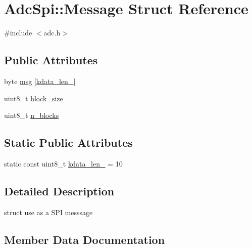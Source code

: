 \hypertarget{structAdcSpi_1_1Message}{}\section{Adc\+Spi\+:\+:Message Struct Reference}
\label{structAdcSpi_1_1Message}


{\ttfamily \#include $<$adc.\+h$>$}

\subsection*{Public Attributes}
\begin{DoxyCompactItemize}
\item 
byte \mbox{\hyperlink{structAdcSpi_1_1Message_a958a98a8a79743532b8bdf1cfe339eb2}{msg}} \mbox{[}\mbox{\hyperlink{structAdcSpi_1_1Message_adf1b26b00ddb16b65de390919c8d2270}{kdata\+\_\+len\+\_\+}}\mbox{]}
\item 
uint8\+\_\+t \mbox{\hyperlink{structAdcSpi_1_1Message_a48fe320baa3704229c910e9a67fe3ee1}{block\+\_\+size}}
\item 
uint8\+\_\+t \mbox{\hyperlink{structAdcSpi_1_1Message_a7f1b15e4a568314fee4210faaed79a62}{n\+\_\+blocks}}
\end{DoxyCompactItemize}
\subsection*{Static Public Attributes}
\begin{DoxyCompactItemize}
\item 
static const uint8\+\_\+t \mbox{\hyperlink{structAdcSpi_1_1Message_adf1b26b00ddb16b65de390919c8d2270}{kdata\+\_\+len\+\_\+}} = 10
\end{DoxyCompactItemize}


\subsection{Detailed Description}
struct use as a S\+PI messsage 

\subsection{Member Data Documentation}
\mbox{\label{structAdcSpi_1_1Message_a48fe320baa3704229c910e9a67fe3ee1}} 

